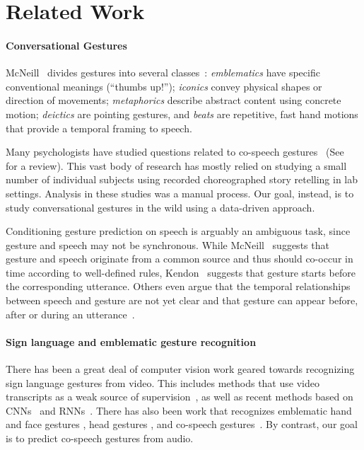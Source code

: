 \documentclass[10pt,twocolumn,letterpaper]{article}
\newcommand{\mypar}[1]{\vspace{-2mm}\paragraph{#1}}
\begin{document}
\section{Related Work}
\label{sec:related}
\paragraph{Conversational Gestures}

McNeill~\cite{McNeill92} divides gestures into several classes~\cite{McNeill92}: \textit{emblematics} have specific conventional meanings (\eg ``thumbs up!''); \textit{iconics} convey physical shapes or direction of movements; \textit{metaphorics} describe abstract content using concrete motion; \textit{deictics} are pointing gestures, and \textit{beats} are repetitive, fast hand motions that provide a temporal framing to speech. 

Many psychologists have studied questions related to co-speech gestures~\cite{McNeill92,kendon_2004} (See~\cite{WAGNER2014} for a review). This vast body of research has mostly relied on studying a small number of individual subjects using recorded choreographed story retelling in lab settings. Analysis in these studies was a manual process. Our goal, instead, is to study conversational gestures in the wild using a data-driven approach.

Conditioning gesture prediction on speech is arguably an ambiguous task, since gesture and speech may not be synchronous. While McNeill~\cite{McNeill92} suggests that gesture and speech originate from a common source and thus should co-occur in time according to well-defined rules, Kendon~\cite{kendon_2004} suggests that gesture starts before the corresponding utterance. Others even argue that the temporal relationships between speech and gesture are not yet clear and that gesture can appear before, after or during an utterance~\cite{Butterworth}.



\mypar{Sign language and emblematic gesture recognition} There has
been a great deal of computer vision work geared towards recognizing
sign language gestures from video. This includes methods that use video transcripts as a weak source of
supervision~\cite{buehler2009learning}, as well as recent methods based on
CNNs~\cite{pfister2014deep,koller2016deep} and RNNs~\cite{camgoz2018sign}.  There has also been work that
recognizes emblematic hand and face gestures
\cite{freeman1995orientation,Darrell-Irfan-Essa}, head gestures \cite{morency2007latent}, and co-speech gestures~\cite{quek2002multimodal}. By contrast, our goal is to predict co-speech gestures from audio.
\end{document}
